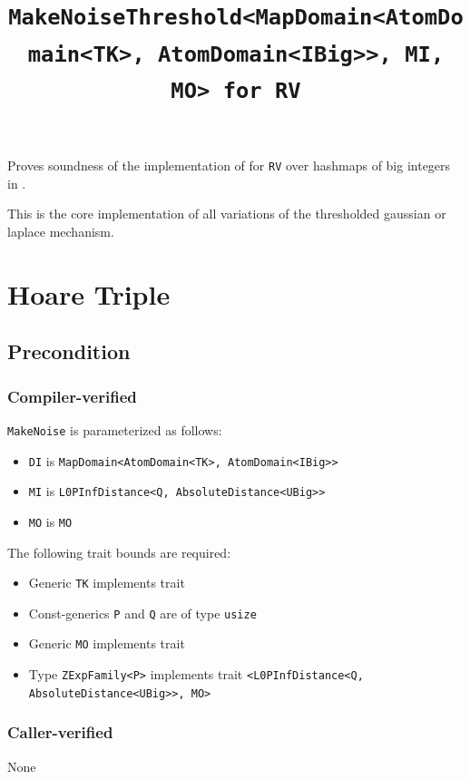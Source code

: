 \documentclass{article}
\title{\texttt{MakeNoiseThreshold<MapDomain<AtomDomain<TK>, AtomDomain<IBig>{}>, MI, MO> for RV}}
\author{\MichaelShoemateAuthor}
\date{}
\begin{document}
\maketitle

\contrib
Proves soundness of the implementation of 
for \texttt{RV} over hashmaps of big integers in .

This is the core implementation of all variations of the thresholded gaussian or laplace mechanism.

\section{Hoare Triple}
\subsection*{Precondition}
\subsubsection*{Compiler-verified}
\texttt{MakeNoise} is parameterized as follows:
\begin{itemize}
    \item \texttt{DI} is \texttt{MapDomain<AtomDomain<TK>, AtomDomain<IBig>{}>}
    \item \texttt{MI} is \texttt{L0PInfDistance<Q, AbsoluteDistance<UBig>{}>}
    \item \texttt{MO} is \texttt{MO}
\end{itemize}

The following trait bounds are required:
\begin{itemize}
    \item Generic \texttt{TK} implements trait 
    \item Const-generics \texttt{P} and \texttt{Q} are of type \texttt{usize}
    \item Generic \texttt{MO} implements trait 
    \item Type \texttt{ZExpFamily<P>} implements trait \texttt{<L0PInfDistance<Q, AbsoluteDistance<UBig>{}>, MO>}
\end{itemize}

\subsubsection*{Caller-verified}
None
\end{document}
